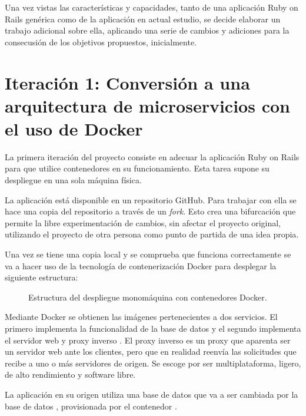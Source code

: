 Una vez vistas las características y capacidades, tanto de una aplicación Ruby on Rails genérica como de la aplicación en actual estudio, se decide elaborar un trabajo adicional sobre ella, aplicando una serie de cambios y adiciones para la consecusión de los objetivos propuestos, inicialmente.

\section[Iteración 1: Arquitectura de microservicios]{Iteración 1: Conversión a una arquitectura de microservicios con el uso de Docker}

La primera iteración del proyecto consiste en adecuar la aplicación Ruby on Rails para que utilice contenedores en su funcionamiento. Esta tarea supone su despliegue en una sola máquina física.

La aplicación  está disponible en un repositorio GitHub. Para trabajar con ella se hace una copia del repositorio a través de un \textit{fork}. Esto crea una bifurcación que permite la libre experimentación de cambios, sin afectar el proyecto original, utilizando el proyecto de otra persona como punto de partida de una idea propia.

Una vez se tiene una copia local y se comprueba que funciona correctamente se va a hacer uso de la tecnología de contenerización Docker para desplegar la siguiente estructura:

\begin{figure}[H]
\caption{Estructura del despliegue monomáquina con contenedores Docker.\label{fig:figure_docker_microservices}}
\end{figure}

Mediante Docker se obtienen las imágenes pertenecientes a dos servicios. El primero implementa la funcionalidad de la base de datos  y el segundo implementa el servidor web y proxy inverso . El proxy inverso es un proxy que aparenta ser un servidor web ante los clientes, pero que en realidad reenvía las solicitudes que recibe a uno o más servidores de origen. Se escoge  por ser multiplataforma, ligero, de alto rendimiento y software libre.

La aplicación en su origen utiliza una base de datos  que va a ser cambiada por la base de datos , provisionada por el contenedor . 

